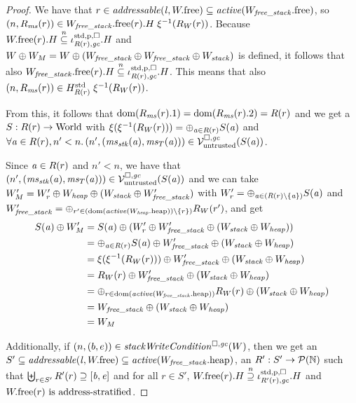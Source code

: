 \begin{proof}
  We have that $r \in \addressable{\lin, \pwfree} \subseteq \activeReg{\pwfree[W_\var{free\_stack}]}$, so $\npair{R_\ms(r)} \in \pwfree[W_\var{free\_stack}](r).H \; \xi^{-1}(R_W(r))$.
  Because $\pwfree(r).H \nsubeq \stdreg{R(r),\gc}{\pur}.H$ and $W\oplus W_M = W \oplus (W_\var{free\_stack} \oplus W_\var{free\_stack} \oplus W_\var{stack})$ is defined, it follows that also $\pwfree[W_\var{free\_stack}](r).H \nsubeq \stdreg{R(r),\gc}{\pur}.H$.
  This means that also $\npair{R_\ms(r)} \in H^{\mathrm{std}}_{R(r)}\; \xi^{-1}(R_W(r))$.

  From this, it follows that $\dom(R_\ms(r).1) = \dom(R_\ms(r).2) = R(r)$ and we get a $S : R(r) \fun \World$ with $\xi(\xi^{-1}(R_W(r))) = \oplus_{\aaddr \in R(r)} S(\aaddr)$ and $\forall \aaddr \in R(r),n' < n \ldotp \npair[n']{(\ms_\stk(\aaddr),\ms_T(\aaddr))} \in \lrv(S(\aaddr))$.

  Since $\aaddr \in R(r)$ and $n' < n$, we have that $\npair[n']{(\ms_\stk(\aaddr),\ms_T(\aaddr))} \in \lrv(S(\aaddr))$ and
  we can take $W_M' = W_r' \oplus W_{\var{heap}} \oplus (W_{\var{stack}} \oplus W_{\var{free\_stack}}')$ with $W_r' = \oplus_{\aaddr \in (R(r)\setminus \{\aaddr\})} S(\aaddr)$ and $W_\var{free\_stack}' = \oplus_{r' \in (\dom(\activeReg{\pwheap[W_\var{heap}]})\setminus \{r\})} R_W(r')$, and get
  \begin{align*}
    S(\aaddr) \oplus W_M'
    &=S(\aaddr) \oplus (W_r' \oplus W_{\var{free\_stack}}' \oplus (W_{\var{stack}}\oplus W_\var{heap}))\\
    &=
    \oplus_{\aaddr \in R(r)} S(\aaddr) \oplus W_{\var{free\_stack}}' \oplus (W_{\var{stack}}\oplus W_{\var{heap}})\\
    &=
    \xi(\xi^{-1}(R_W(r))) \oplus W_{\var{free\_stack}}' \oplus (W_{\var{stack}} \oplus W_\var{heap})\\
    &=
    R_W(r) \oplus W_{\var{free\_stack}}' \oplus (W_{\var{stack}} \oplus W_\var{heap})\\
    &=
    \oplus_{r \in \dom(\activeReg{\pwheap[W_\var{free\_stack}]})} R_W(r)\oplus (W_{\var{stack}} \oplus W_{\var{heap}})\\
    &=
      W_\var{free\_stack} \oplus (W_{\var{stack}} \oplus W_{\var{heap}})\\
      &= W_M
  \end{align*}

  Additionally, if $\npair{(b,e)}\in\stackWriteCond{W}$, then
  we get an $S'\subseteq \addressable{\lin, \pwfree} \subseteq \activeReg{\pwheap[W_\var{free\_stack}]}$, an $R' : S' \fun \powerset{\nats}$ such that $\biguplus_{r \in S'} R'(r) \supseteq [\baddr,\eaddr]$ and
  for all $r \in S'$, $\pwfree(r).H \nsupeq \stdreg{R'(r),\gc}{\pur}.H$ and
  $\pwfree(r) \text{ is address-stratified}$.


\end{proof}
